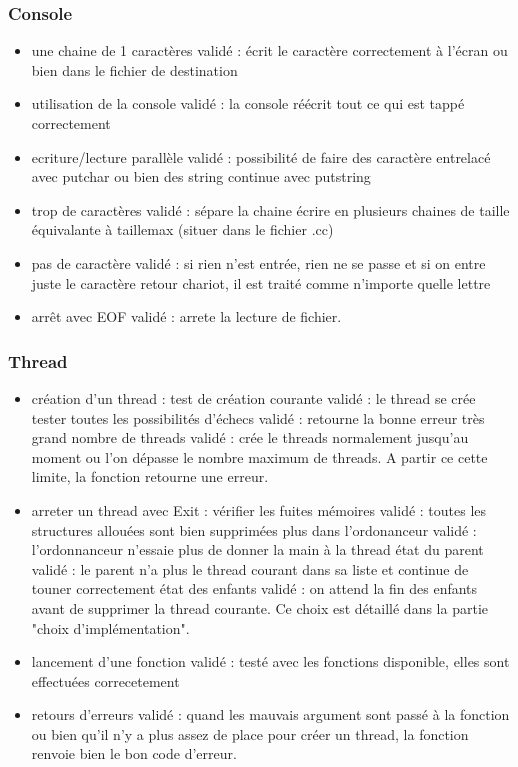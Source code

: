\documentclass{article}
\begin{document}
		\subsubsection{Console}
			\begin{itemize}
				\item une chaine de 1 caractères 			validé : écrit le caractère	correctement à l'écran ou bien dans le fichier de destination
				\item utilisation de la console				validé : la console réécrit tout ce qui est tappé correctement
				\item ecriture/lecture parallèle			validé : possibilité de faire des caractère entrelacé avec putchar ou bien des string continue avec putstring
				\item trop de caractères					validé : sépare la chaine écrire en plusieurs chaines de taille équivalante à taillemax (situer dans le fichier .cc)
				\item pas de caractère 						validé : si rien n'est entrée, rien ne se passe et si on entre juste le caractère retour chariot, il est traité comme n'importe quelle lettre
				\item arrêt avec EOF 						validé : arrete la lecture de fichier.
			\end{itemize}

		\subsubsection{Thread}
			\begin{itemize}
				\item création d'un thread :
					\subitem test de création courante 				validé : le thread se crée
					\subitem tester toutes les possibilités d'échecs	validé : retourne la bonne erreur
					\subitem très grand nombre de threads 				validé : crée le threads normalement jusqu'au moment ou l'on dépasse le nombre maximum de threads. A partir ce cette limite, la fonction retourne une erreur.
				\item arreter un thread avec Exit :
					\subitem vérifier les fuites mémoires		validé : toutes les structures allouées sont bien supprimées
					\subitem plus dans l'ordonanceur			validé : l'ordonnanceur n'essaie plus de donner la main à la thread
					\subitem état du parent					validé : le parent n'a plus le thread courant dans sa liste et continue de touner correctement
					\subitem état des enfants					validé : on attend la fin des enfants avant de supprimer la thread courante. Ce choix est détaillé dans la partie "choix d'implémentation".
				\item lancement d'une fonction		validé : testé avec les fonctions disponible, elles sont effectuées correcetement
				\item retours d'erreurs				validé : quand les mauvais argument sont passé à la fonction ou bien qu'il n'y a plus assez de place pour créer un thread, la fonction renvoie bien le bon code d'erreur.
			\end{itemize}
\end{document}
